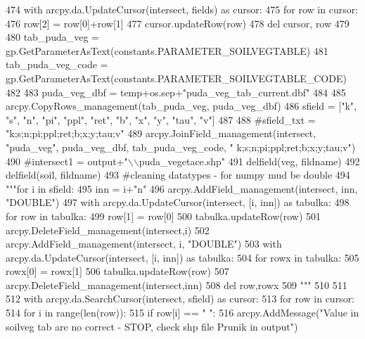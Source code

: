 \begin{DoxyCode}
474   with arcpy.da.UpdateCursor(intersect, fields) \textcolor{keyword}{as} cursor:
475       \textcolor{keywordflow}{for} row \textcolor{keywordflow}{in} cursor:
476          row[2] = row[0]+row[1]
477          cursor.updateRow(row)
478   del cursor, row
479 
480   tab\_puda\_veg = gp.GetParameterAsText(constants.PARAMETER\_SOILVEGTABLE)
481   tab\_puda\_veg\_code = gp.GetParameterAsText(constants.PARAMETER\_SOILVEGTABLE\_CODE)
482 
483   puda\_veg\_dbf = temp+os.sep+\textcolor{stringliteral}{"puda\_veg\_tab\_current.dbf"}
484 
485   arcpy.CopyRows\_management(tab\_puda\_veg, puda\_veg\_dbf)
486   sfield = [\textcolor{stringliteral}{"k"}, \textcolor{stringliteral}{"s"}, \textcolor{stringliteral}{"n"}, \textcolor{stringliteral}{"pi"}, \textcolor{stringliteral}{"ppl"}, \textcolor{stringliteral}{"ret"}, \textcolor{stringliteral}{"b"}, \textcolor{stringliteral}{"x"}, \textcolor{stringliteral}{"y"}, \textcolor{stringliteral}{"tau"}, \textcolor{stringliteral}{"v"}]
487 
488   \textcolor{comment}{#sfield\_txt = "k;s;n;pi;ppl;ret;b;x;y;tau;v"
}
489   arcpy.JoinField\_management(intersect, \textcolor{stringliteral}{"puda\_veg"}, puda\_veg\_dbf, tab\_puda\_veg\_code, \textcolor{stringliteral}{"
      k;s;n;pi;ppl;ret;b;x;y;tau;v"})
490   \textcolor{comment}{#intersect1 = output+"\(\backslash\)\(\backslash\)puda\_vegetace.shp"
}
491   delfield(veg, fildname)
492   delfield(soil, fildname)
493   \textcolor{comment}{#cleaning datatypes - for numpy mud be double
}
494   \textcolor{stringliteral}{"""for i in sfield:
}
495 \textcolor{stringliteral}{      inn = i+"n"
}
496 \textcolor{stringliteral}{      arcpy.AddField\_management(intersect, inn, "DOUBLE")
}
497 \textcolor{stringliteral}{      with arcpy.da.UpdateCursor(intersect, [i, inn]) as tabulka:
}
498 \textcolor{stringliteral}{        for row in tabulka:
}
499 \textcolor{stringliteral}{            row[1] = row[0]
}
500 \textcolor{stringliteral}{            tabulka.updateRow(row)
}
501 \textcolor{stringliteral}{      arcpy.DeleteField\_management(intersect,i)
}
502 \textcolor{stringliteral}{      arcpy.AddField\_management(intersect, i, "DOUBLE")
}
503 \textcolor{stringliteral}{      with arcpy.da.UpdateCursor(intersect, [i, inn]) as tabulka:
}
504 \textcolor{stringliteral}{        for rowx in tabulka:
}
505 \textcolor{stringliteral}{            rowx[0] = rowx[1]
}
506 \textcolor{stringliteral}{            tabulka.updateRow(row)
}
507 \textcolor{stringliteral}{      arcpy.DeleteField\_management(intersect,inn)
}
508 \textcolor{stringliteral}{  del row,rowx
}
509 \textcolor{stringliteral}{  """}
510 
511 
512   with arcpy.da.SearchCursor(intersect, sfield) \textcolor{keyword}{as} cursor:
513       \textcolor{keywordflow}{for} row \textcolor{keywordflow}{in} cursor:
514         \textcolor{keywordflow}{for} i \textcolor{keywordflow}{in} range(len(row)):
515           \textcolor{keywordflow}{if} row[i] == \textcolor{stringliteral}{" "}:
516             arcpy.AddMessage(\textcolor{stringliteral}{"Value in soilveg tab are no correct - STOP, check shp file Prunik in output"})
      

\end{DoxyCode}
